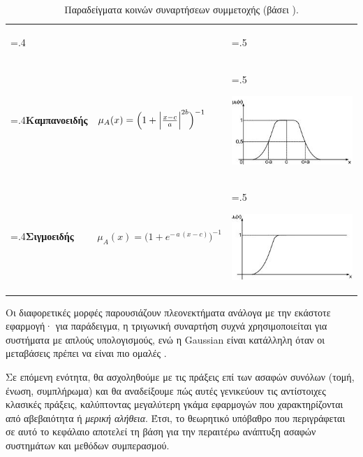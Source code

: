 \begin{table}[h!]
\begin{tabularx}{\textwidth}{>{\hsize=.4\hsize}X X >{\hsize=.5\hsize}X}
\begin{center}
           \end{center}\\
         \textbf{Καμπανοειδής}
         & \(\displaystyle \mu_{A}(x) = \Bigl(1 + \Bigl|\tfrac{x-c}{a}\Bigr|^{2b}\Bigr)^{-1}\)
         & \begin{center}
             \includegraphics[scale=0.7]{images/bell.jpg}
           \end{center}\\
         \textbf{Σιγμοειδής}
         & \(\displaystyle \mu_{A}(x) = \bigl(1 + e^{-\,a\,(x-c)}\bigr)^{-1}\)
         & \begin{center}
             \includegraphics[scale=0.7]{images/sigm.jpg}
           \end{center}\\
    \end{tabularx}
    \caption{Παραδείγματα κοινών συναρτήσεων συμμετοχής (βάσει \cite{KlirYuan1995,Ross2010}).}
    \label{tab:part}
\end{table}

\medskip
Οι διαφορετικές μορφές παρουσιάζουν πλεονεκτήματα ανάλογα με την εκάστοτε εφαρμογή· για παράδειγμα, η τριγωνική συναρτήση συχνά χρησιμοποιείται για συστήματα με απλούς υπολογισμούς, ενώ η \textlatin{Gaussian} είναι κατάλληλη όταν οι μεταβάσεις πρέπει να είναι πιο ομαλές \cite{Zadeh1965,Ross2010}.

\medskip
Σε επόμενη ενότητα, θα ασχοληθούμε με τις πράξεις επί των ασαφών συνόλων (τομή, ένωση, συμπλήρωμα) και θα αναδείξουμε πώς αυτές γενικεύουν τις αντίστοιχες κλασικές πράξεις, καλύπτοντας μεγαλύτερη γκάμα εφαρμογών που χαρακτηρίζονται από αβεβαιότητα ή \emph{μερική αλήθεια}. Έτσι, το θεωρητικό υπόβαθρο που περιγράφεται σε αυτό το κεφάλαιο αποτελεί τη βάση για την περαιτέρω ανάπτυξη ασαφών συστημάτων και μεθόδων συμπερασμού.

